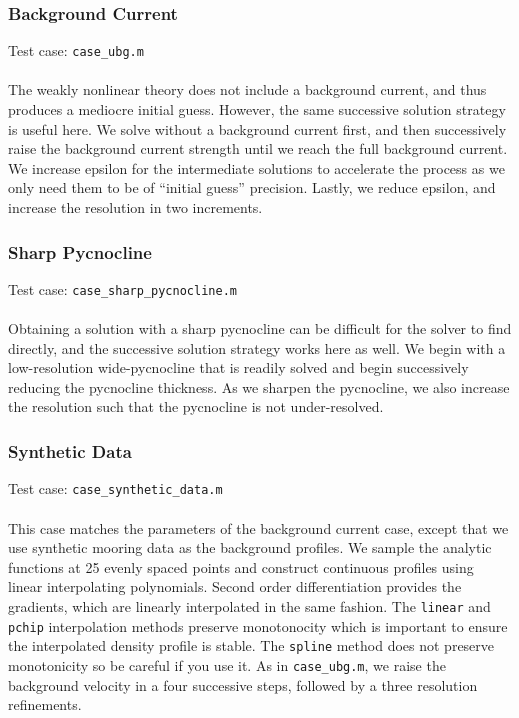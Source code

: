 \documentclass[letterpaper]{article}
\begin{document}
\subsubsection{Background Current}
Test case: \verb"case_ubg.m" \\\\
The weakly nonlinear theory does not include a background current, and thus produces a mediocre initial guess.
However, the same successive solution strategy is useful here.
We solve without a background current first, and then successively raise the background current strength until we reach the full background current.
We increase epsilon for the intermediate solutions to accelerate the process as we only need them to be of ``initial guess'' precision.
Lastly, we reduce epsilon, and increase the resolution in two increments.

\subsubsection{Sharp Pycnocline}
Test case: \verb"case_sharp_pycnocline.m" \\\\
Obtaining a solution with a sharp pycnocline can be difficult for the solver to find directly, and the successive solution strategy works here as well.
We begin with a low-resolution wide-pycnocline that is readily solved and begin successively reducing the pycnocline thickness.
As we sharpen the pycnocline, we also increase the resolution such that the pycnocline is not under-resolved.

\subsubsection{Synthetic Data}
Test case: \verb"case_synthetic_data.m" \\\\
This case matches the parameters of the background current case, except that we use synthetic mooring data as the background profiles.
We sample the analytic functions at 25 evenly spaced points and construct continuous profiles using linear interpolating polynomials.
Second order differentiation provides the gradients, which are linearly interpolated in the same fashion.
The \verb+linear+ and \verb+pchip+ interpolation methods preserve monotonocity which is important to ensure the interpolated density profile is stable.
The \verb+spline+ method does not preserve monotonicity so be careful if you use it.
As in \verb"case_ubg.m", we raise the background velocity in a four successive steps, followed by a three resolution refinements.
\end{document}

